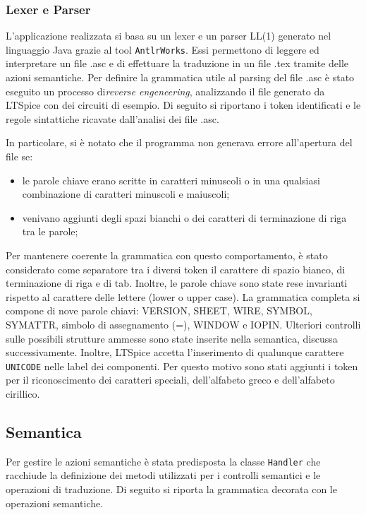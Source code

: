 \clearpage
\subsubsection{Lexer e Parser}
L'applicazione realizzata si basa su un lexer e un parser LL(1) generato nel linguaggio Java grazie al tool \texttt{AntlrWorks}. Essi permettono di leggere ed interpretare un file .asc e di effettuare la traduzione in un file .tex tramite delle azioni semantiche. Per definire la grammatica utile al parsing del file .asc è stato eseguito un processo di\textit{reverse engeneering}, analizzando il file generato da LTSpice con dei circuiti di esempio. Di seguito si riportano i token identificati e le regole sintattiche ricavate dall'analisi dei file .asc.

In particolare, si è notato che il programma non generava errore all'apertura del file se:
\begin{itemize}
	\item le parole chiave erano scritte in caratteri minuscoli o in una qualsiasi combinazione di caratteri minuscoli e maiuscoli;
	\item venivano aggiunti degli spazi bianchi o dei caratteri di terminazione di riga tra le parole;
\end{itemize}
Per mantenere coerente la grammatica con questo comportamento, è stato considerato come separatore tra i diversi token il carattere di spazio bianco, di terminazione di riga e di tab. Inoltre, le parole chiave sono state rese invarianti rispetto al carattere delle lettere (lower o upper case). La grammatica completa si compone di nove parole chiavi: VERSION, SHEET, WIRE, SYMBOL, SYMATTR, simbolo di assegnamento (=), WINDOW e IOPIN. Ulteriori controlli sulle possibili strutture ammesse sono state inserite nella semantica, discussa successivamente. Inoltre, LTSpice accetta l'inserimento di qualunque carattere \texttt{UNICODE} nelle label dei componenti. Per questo motivo sono stati aggiunti i token per il riconoscimento dei caratteri speciali, dell'alfabeto greco e dell'alfabeto cirillico.

\subsection{Semantica}
Per gestire le azioni semantiche è stata predisposta la classe \texttt{Handler} che racchiude la definizione dei metodi utilizzati per i controlli semantici e le operazioni di traduzione. Di seguito si riporta la grammatica decorata con le operazioni semantiche.


